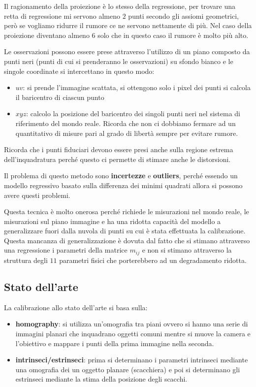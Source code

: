 \begin{nota}
    Il ragionamento della proiezione è lo stesso della regressione, per trovare 
    una retta di regressione mi servono almeno $2$ punti secondo gli assiomi geometrici,
    però se vogliamo ridurre il rumore ce ne servono nettamente di più. Nel caso 
    della proiezione diventano almeno $6$ solo che in questo caso il rumore è molto 
    più alto.
\end{nota}

Le osservazioni possono essere prese attraverso l'utilizzo di un piano composto 
da punti neri (punti di cui si prenderanno le osservazioni) su sfondo bianco e le singole coordinate si intercettano in questo modo:
\begin{itemize}
    \item $uv$: si prende l'immagine scattata, si ottengono solo i pixel dei punti 
    si calcola il baricentro di ciascun punto
    \item $xyz$: calcolo la posizione del baricentro dei singoli punti neri nel 
    sistema di riferimento del mondo reale. Ricorda che non ci dobbiamo fermare 
    ad un quantitativo di misure pari al grado di libertà sempre per evitare rumore.
\end{itemize}

Ricorda che i punti fiduciari devono essere presi anche sulla regione estrema 
dell'inquadratura perché questo ci permette di stimare anche le distorsioni.

Il problema di questo metodo sono \textbf{incertezze} e \textbf{outliers}, perché
essendo un modello regressivo basato sulla differenza dei minimi quadrati allora 
si possono avere questi problemi. 

Questa tecnica è molto onerosa perché richiede le misurazioni nel mondo reale, 
le misurazioni sul piano immagine e ha una ridotta capacità del modello a generalizzare 
fuori dalla nuvola di punti su cui è stata effettuata la calibrazione. Questa 
mancanza di generalizzazione è dovuta dal fatto che si stimano attraverso una regressione 
i parametri della matrice $m_{ij}$ e non si stimano attraverso la struttura degli 
$11$ parametri fisici che porterebbero ad un degradamento ridotta.

\subsection{Stato dell'arte}
La calibrazione allo stato dell'arte si basa sulla:
\begin{itemize}
    \item \textbf{homography}: si utilizza un'omografia tra piani ovvero si hanno 
    una serie di immagini planari che inquadrano oggetti comuni mentre si muove 
    la camera e l'obiettivo e mappare i punti della prima immagine nella seconda.
    \item \textbf{intrinseci/estrinseci}: prima si determinano i parametri intrinseci
    mediante una omografia dei un oggetto planare (scacchiera) e poi si determinano 
    gli estrinseci mediante la stima della posizione degli scacchi.
\end{itemize} 

